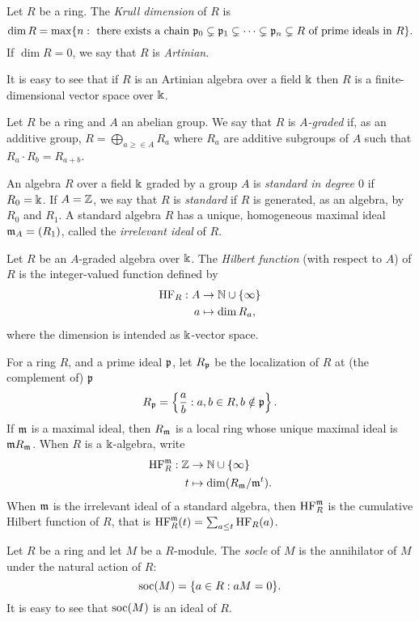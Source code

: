\begin{definition}
\label{introduction-definition-Krull}
Let $R$ be a ring. The {\it Krull dimension} of $R$ is 
\[
\dim R = \max \{ n : \text{ there exists a chain $\mathfrak{p}_0 \subsetneq \mathfrak{p}_1 \subsetneq \cdots \subsetneq \mathfrak{p}_n \subsetneq R$ of prime ideals in $R$}\}.
\]
If $\dim R = 0$, we say that $R$ is {\it Artinian}.
\end{definition}
It is easy to see that if $R$ is an Artinian algebra over a field $\Bbbk$ then $R$ is a finite-dimensional vector space over $\Bbbk$. 

\begin{definition}
\label{introduction-definition-graded}
Let $R$ be a ring and $A$ an abelian group. We say that $R$ is {\it $A$-graded} if, as an additive group, $R = \bigoplus_{a\geq \in A} R_a$ where $R_a$ are additive subgroups of $A$ such that $R_a \cdot R_b = R_{a + b}$.

An algebra $R$ over a field $\Bbbk$ graded by a group $A$ is {\it standard in degree $0$} if $R_0 = \Bbbk$. If $A = \mathbb{Z}$, we say that $R$ is {\it standard} if $R$ is generated, as an algebra, by $R_0$ and $R_1$. A standard algebra $R$ has a unique, homogeneous maximal ideal $\mathfrak{m}_A = (R_1)$, called the {\it irrelevant ideal} of $R$.
\end{definition}

\begin{definition}
\label{introduction-definition-hilbertfunction}
Let $R$ be an $A$-graded algebra over $\Bbbk$. The {\it Hilbert function} (with respect to $A$) of $R$ is the integer-valued function defined by 
\[
\begin{aligned}
\mathrm{HF}_R : A &\to \mathbb{N} \cup \{ \infty\} \\
a &\mapsto \dim R_a,
\end{aligned}
\]
where the dimension is intended as $\Bbbk$-vector space.
\end{definition}

For a ring $R$, and a prime ideal $\mathfrak{p}$, let $R_{\mathfrak{p}}$ be the localization of $R$ at (the complement of) $\mathfrak{p}$
\[
 R_{\mathfrak{p}} = \left\{ \frac{a}{b} : a,b \in R, b \notin \mathfrak{p} \right\}.
\]
If $\mathfrak{m}$ is a maximal ideal, then $R_{\mathfrak{m}}$ is a local ring whose unique maximal ideal is $\mathfrak{m} R_{\mathfrak{m}}$. When $R$ is a $\Bbbk$-algebra, write 
\[
\begin{aligned}
\mathrm{HF}_R^{\mathfrak{m}} : \mathbb{Z} &\to \mathbb{N} \cup \{ \infty\} \\
t &\mapsto \dim ( R_{\mathfrak{m}} / \mathfrak{m}^{t}). 
\end{aligned}
\]
When $\mathfrak{m}$ is the irrelevant ideal of a standard algebra, then  $\mathrm{HF}_R^{\mathfrak{m}}$ is the cumulative Hilbert function of $R$, that is $\mathrm{HF}_R^{\mathfrak{m}}(t) = \sum_{a \leq t} \mathrm{HF}_R(a)$.


\begin{definition}
 \label{introduction-definition-socleandgorenstein}
Let $R$ be a ring and let $M$ be a $R$-module. The {\it socle} of $M$ is the annihilator of $M$ under the natural action of $R$:
\[
\operatorname{soc}(M) = \{ a \in R : aM = 0\}.
\]
It is easy to see that $\operatorname{soc}(M)$ is an ideal of $R$.
\end{definition}


